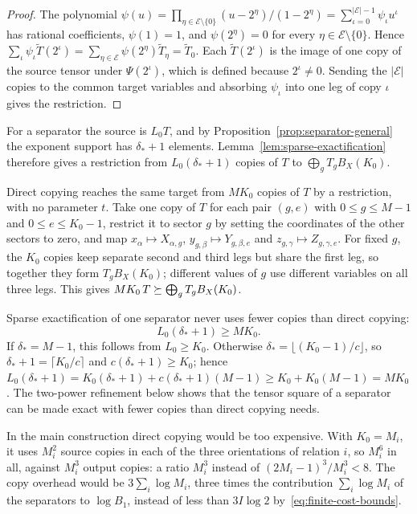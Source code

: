 \begin{proof}
The polynomial
\(\psi(u)=\prod_{\eta\in\mathcal E\setminus\{0\}}(u-2^\eta)/(1-2^\eta)
=\sum_{\iota=0}^{|\mathcal E|-1}\psi_\iota u^\iota\) has rational
coefficients, \(\psi(1)=1\), and \(\psi(2^\eta)=0\) for every
\(\eta\in\mathcal E\setminus\{0\}\). Hence
\(\sum_\iota\psi_\iota\widetilde T(2^\iota)
=\sum_{\eta\in\mathcal E}\psi(2^\eta)\widetilde T_\eta=\widetilde T_0\).
Each \(\widetilde T(2^\iota)\) is the image of one copy of the source
tensor under \(\Psi(2^\iota)\), which is defined because \(2^\iota\ne0\).
Sending the \(|\mathcal E|\) copies to the common target variables and
absorbing \(\psi_\iota\) into one leg of copy \(\iota\) gives the
restriction.
\end{proof}

For a separator the source is \(L_0T\), and by
Proposition~\ref{prop:separator-general} the exponent support has
\(\delta_*+1\) elements. Lemma~\ref{lem:sparse-exactification} therefore
gives a restriction from \(L_0(\delta_*+1)\) copies of \(T\) to
\(\bigoplus_gT_gB_X(K_0)\).

Direct copying reaches the same target from \(MK_0\) copies of \(T\) by a
restriction, with no parameter \(t\). Take one copy of \(T\) for each pair
\((g,e)\) with \(0\le g\le M-1\) and \(0\le e\le K_0-1\), restrict it to
sector \(g\) by setting the coordinates of the other sectors to zero, and
map \(x_\alpha\mapsto X_{\alpha,g}\), \(y_{g,\beta}\mapsto Y_{g,\beta,e}\)
and \(z_{g,\gamma}\mapsto Z_{g,\gamma,e}\). For fixed \(g\), the \(K_0\)
copies keep separate second and third legs but share the first leg, so
together they form \(T_gB_X(K_0)\); different values of \(g\) use
different variables on all three legs. This gives
\(MK_0\,T\succeq\bigoplus_gT_gB_X(K_0)\).

Sparse exactification of one separator never uses fewer copies than direct
copying:
\begin{equation}\label{eq:one-power-limit}
 L_0(\delta_*+1)\ge MK_0.
\end{equation}
If \(\delta_*=M-1\), this follows from \(L_0\ge K_0\). Otherwise
\(\delta_*=\lfloor(K_0-1)/c\rfloor\), so \(\delta_*+1=\lceil K_0/c\rceil\)
and \(c(\delta_*+1)\ge K_0\); hence
\(L_0(\delta_*+1)=K_0(\delta_*+1)+c(\delta_*+1)(M-1)\ge K_0+K_0(M-1)=MK_0\).
The two-power refinement below shows that the tensor square of a
separator can be made exact with fewer copies than direct copying needs.

In the main construction direct copying would be too expensive. With
\(K_0=M_i\), it uses \(M_i^2\) source copies in each of the three
orientations of relation \(i\), so \(M_i^6\) in all, against \(M_i^3\)
output copies: a ratio \(M_i^3\) instead of \((2M_i-1)^3/M_i^3<8\). The copy
overhead would be \(3\sum_i\log M_i\), three times the contribution
\(\sum_i\log M_i\) of the separators to \(\log B_1\), instead of less than
\(3I\log2\) by~\eqref{eq:finite-cost-bounds}.

